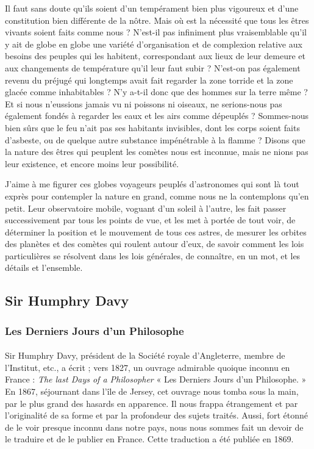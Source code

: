 \documentclass[a4paper, 11pt, oneside]{article}
\begin{document}
Il faut sans doute qu'ils soient d'un tempérament bien plus vigoureux et d'une constitution bien différente de la nôtre. Mais où est la nécessité que tous les êtres vivants soient faits comme nous ? N'est-il pas infiniment plus vraisemblable qu'il y ait de globe en globe une variété d'organisation et de complexion relative aux besoins des peuples qui les habitent, correspondant aux lieux de leur demeure et aux changements de température qu'il leur faut subir ? N'est-on pas également revenu du préjugé qui longtemps avait fait regarder la zone torride et la zone glacée comme inhabitables ? N'y a-t-il donc que des hommes sur la terre même ? Et si nous n'eussions jamais vu ni poissons ni oiseaux, ne serions-nous pas également fondés à regarder les eaux et les airs comme dépeuplés ? Sommes-nous bien sûrs que le feu n'ait pas ses habitants invisibles, dont les corps soient faits d'asbeste, ou de quelque autre substance impénétrable à la flamme ? Disons que la nature des êtres qui peuplent les comètes nous est inconnue, mais ne nions pas leur existence, et encore moins leur possibilité.

J'aime à me figurer ces globes voyageurs peuplés d'astronomes qui sont là tout exprès pour contempler la nature en grand, comme nous ne la contemplons qu'en petit. Leur observatoire mobile, voguant d'un soleil à l'autre, les fait passer successivement par tous les points de vue, et les met à portée de tout voir, de déterminer la position et le mouvement de tous ces astres, de mesurer les orbites des planètes et des comètes qui roulent autour d'eux, de savoir comment les lois particulières se résolvent dans les lois générales, de connaître, en un mot, et les détails et l'ensemble.
\clearpage
\subsection{Sir Humphry Davy}
\subsubsection{Les Derniers Jours d'un Philosophe}
\paragraph{}
Sir Humphry Davy, président de la Société royale d'Angleterre, membre de l'Institut, etc., a écrit ; vers 1827, un ouvrage admirable quoique inconnu en France : \emph{The last Days of a Philosopher} « Les Derniers Jours d'un Philosophe. » En 1867, séjournant dans l'île de Jersey, cet ouvrage nous tomba sous la main, par le plus grand des hasards en apparence. Il nous frappa étrangement et par l'originalité de sa forme et par la profondeur des sujets traités. Aussi, fort étonné de le voir presque inconnu dans notre pays, nous nous sommes fait un devoir de le traduire et de le publier en France. Cette traduction a été publiée en 1869.
\end{document}
